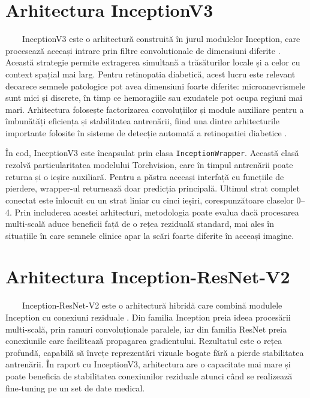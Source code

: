 \documentclass[12pt, a4paper, twoside, romanian]{teza-upb}
\begin{document}
\section{Arhitectura InceptionV3}

\ \ \ \ InceptionV3 este o arhitectură construită în jurul modulelor Inception, care procesează aceeași
intrare prin filtre convoluționale de dimensiuni diferite \cite{22_szegedy2016rethinking}. Această strategie permite extragerea
simultană a trăsăturilor locale și a celor cu context spațial mai larg.
Pentru retinopatia diabetică, acest lucru este relevant deoarece semnele patologice pot avea
dimensiuni foarte diferite: microanevrismele sunt mici și discrete, în timp ce hemoragiile
sau exudatele pot ocupa regiuni mai mari. Arhitectura folosește factorizarea convoluțiilor și
module auxiliare pentru a îmbunătăți eficiența și stabilitatea antrenării, fiind una dintre
arhitecturile importante folosite în sisteme de detecție automată a retinopatiei diabetice \cite{3_gulshan2016development}.
\bigskip

În cod, InceptionV3 este încapsulat prin clasa \texttt{InceptionWrapper}. Această clasă rezolvă particularitatea
modelului Torchvision, care în timpul antrenării poate returna și o ieșire auxiliară.
Pentru a păstra aceeași interfață cu funcțiile de pierdere, wrapper-ul returnează doar
predicția principală. Ultimul strat complet conectat este înlocuit cu un strat liniar
cu cinci ieșiri, corespunzătoare claselor 0--4. Prin includerea acestei arhitecturi, metodologia
poate evalua dacă procesarea multi-scală aduce beneficii față de o rețea reziduală standard,
mai ales în situațiile în care semnele clinice apar la scări foarte diferite în aceeași
imagine.

\section{Arhitectura Inception-ResNet-V2}

\ \ \ \ Inception-ResNet-V2 este o arhitectură hibridă care combină modulele Inception cu conexiuni reziduale
\cite{25_szegedy2017inception}.
Din familia Inception preia ideea procesării multi-scală, prin ramuri convoluționale paralele, iar
din familia ResNet preia conexiunile care facilitează propagarea gradientului. Rezultatul este o
rețea profundă, capabilă să învețe reprezentări vizuale bogate fără a pierde stabilitatea
antrenării. În raport cu InceptionV3, arhitectura are o capacitate mai mare și poate
beneficia de stabilitatea conexiunilor reziduale atunci când se realizează fine-tuning pe un set
de date medical.
\bigskip
\end{document}
